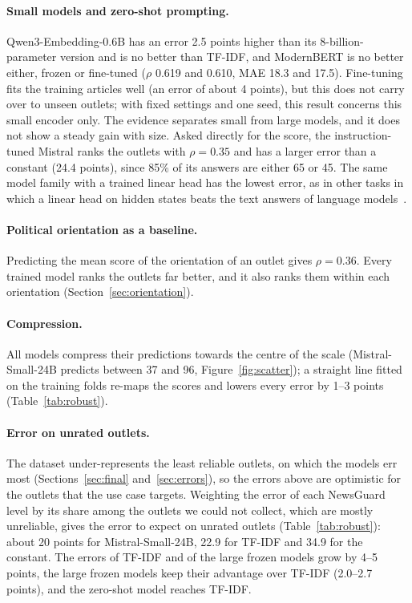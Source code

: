 \documentclass[11pt,a4paper]{article}
\begin{document}
\paragraph{Small models and zero-shot prompting.} Qwen3-Embedding-0.6B has an error 2.5 points higher than its
8-billion-parameter version and is no better than TF-IDF, and ModernBERT is no better either, frozen or fine-tuned
($\rho$ 0.619 and 0.610, MAE 18.3 and 17.5). Fine-tuning fits the training articles well (an error of about 4 points),
but this does not carry over to unseen outlets; with fixed settings and one seed, this result concerns this small
encoder only. The evidence separates small from large models, and it does not show a steady gain with size. Asked
directly for the score, the instruction-tuned Mistral ranks the outlets with $\rho = 0.35$ and has a larger error than a
constant (24.4 points), since 85\% of its answers are either 65 or 45. The same model family with a trained linear head
has the lowest error, as in other tasks in which a linear head on hidden states beats the text answers of language
models~\cite{buckmann2025revealing}.

\paragraph{Political orientation as a baseline.} Predicting the mean score of the orientation of an outlet gives
$\rho = 0.36$. Every trained model ranks the outlets far better, and it also ranks them within each orientation
(Section~\ref{sec:orientation}).

\paragraph{Compression.} All models compress their predictions towards the centre of the scale (Mistral-Small-24B
predicts between 37 and 96, Figure~\ref{fig:scatter}); a straight line fitted on the training folds re-maps the scores
and lowers every error by 1--3 points (Table~\ref{tab:robust}).

\paragraph{Error on unrated outlets.} The dataset under-represents the least reliable outlets, on which the models err
most (Sections~\ref{sec:final} and~\ref{sec:errors}), so the errors above are optimistic for the outlets that the use
case targets. Weighting the error of each NewsGuard level by its share among the outlets we could not collect, which
are mostly unreliable, gives the error to expect on unrated outlets (Table~\ref{tab:robust}): about 20 points for
Mistral-Small-24B, 22.9 for TF-IDF and 34.9 for the constant. The errors of TF-IDF and of the large frozen models grow by 4--5 points, the large frozen models keep their
advantage over TF-IDF (2.0--2.7 points), and the zero-shot model reaches TF-IDF.
\end{document}
